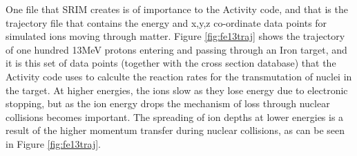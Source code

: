 One file that SRIM creates is of importance to the Activity code, and that is the trajectory file that contains the energy and x,y,z co-ordinate data points for simulated ions moving through matter.  Figure \ref{fig:fe13traj} shows the trajectory of one hundred 13MeV protons entering and passing through an Iron target, and it is this set of data points (together with the cross section database) that the Activity code uses to calculte the reaction rates for the transmutation of nuclei in the target.  At higher energies, the ions slow as they lose energy due to electronic stopping, but as the ion energy drops the mechanism of loss through nuclear collisions becomes important.  The spreading of ion depths at lower energies is a result of the higher momentum transfer during nuclear collisions, as can be seen in Figure \ref{fig:fe13traj}.